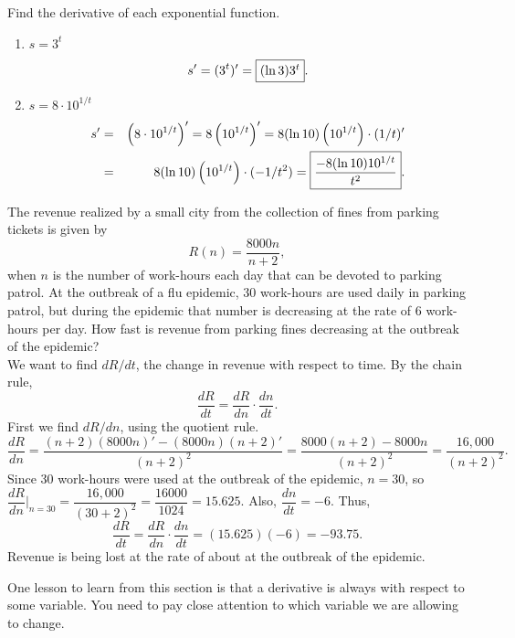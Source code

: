 \documentclass{book}
\begin{document}
\begin{Exam} Find the derivative of each exponential function.\\
\begin{enumerate}
\item $s = 3^t$
\[s' = (3^t)' = \fbox{$(\ln 3)3^t$}.\]

\item $s = 8\cdot 10^{1/t}$
\begin{eqnarray*}
s' &=& \left(8\cdot 10^{1/t}\right)' = 8\left(10^{1/t}\right)' = 8(\ln 10)\left(10^{1/t}\right)\cdot (1/t)'\\
&=& 8(\ln 10)\left(10^{1/t}\right)\cdot (-1/t^2) = \fbox{$\dfrac{-8(\ln 10)10^{1/t}}{t^2}$}.
\end{eqnarray*}
\end{enumerate}
\end{Exam}\vs

\begin{Exam} The revenue realized by a small city from the collection of fines from parking tickets is given by 
\[R(n) = \dfrac{8000n}{n+2},\] when $n$ is the number of work-hours each day that can be devoted to parking patrol. At the outbreak of a flu epidemic, 30 work-hours are used daily in parking patrol, but during the epidemic that number is decreasing at the rate of 6 work-hours per day. How fast is revenue from parking fines decreasing at the outbreak of the epidemic?\\

We want to find $dR/dt$, the change in revenue with respect to time. By the chain rule,
\[\dfrac{dR}{dt} = \dfrac{dR}{dn}\cdot \dfrac{dn}{dt}.\] First we find $dR/dn$, using the quotient rule.
\[\dfrac{dR}{dn} = \dfrac{(n+2)(8000n)' - (8000n)(n+2)'}{(n+2)^2} = \dfrac{8000(n+2) - 8000n}{(n+2)^2} = \dfrac{16,000}{(n+2)^2}.\] Since 30 work-hours were used at the outbreak of the epidemic, $n=30$, so $\dfrac{dR}{dn}\bigg\vert_{n=30} = \dfrac{16,000}{(30+2)^2} = \dfrac{16000}{1024} =  15.625$. Also, $\dfrac{dn}{dt} = -6$. Thus, 
\[ \dfrac{dR}{dt} = \dfrac{dR}{dn}\cdot\dfrac{dn}{dt} = (15.625)(-6) = -93.75.\] Revenue is being lost at the rate of about  at the outbreak of the epidemic. 
\end{Exam}\vs

One lesson to learn from this section is that a derivative is always with respect to some variable. You need to pay close attention to which variable we are allowing to change. 
\end{document}
